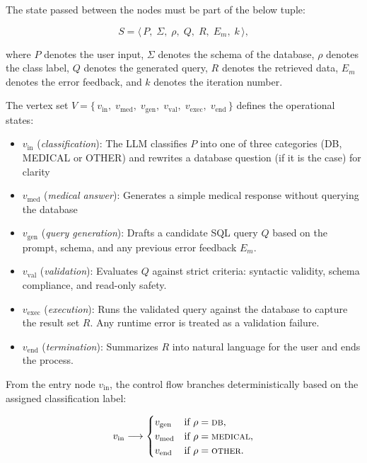 \vspace{1em}

The state passed between the nodes must be part of the below tuple:

\begin{equation}
    S = \langle\, P,\; \Sigma,\; \rho,\; Q,\; R,\; E_m,\; k \,\rangle,
    \label{eq:state}
\end{equation}

where $P$ denotes the user input, $\Sigma$ denotes the schema of the database, $\rho$ denotes the class label, $Q$ denotes the generated query, $R$ denotes the retrieved data, $E_m$ denotes the error feedback, and $k$ denotes the iteration number.

\clearpage

The vertex set $V = \{\, v_{\mathrm{in}},\; v_{\mathrm{med}},\; v_{\mathrm{gen}},\; v_{\mathrm{val}},\; v_{\mathrm{exec}},\; v_{\mathrm{end}} \,\}$ defines the operational states:

\begin{itemize}
    \item $v_{\mathrm{in}}$ (\emph{classification}): The LLM classifies $P$ into one of three categories  (DB, MEDICAL or OTHER) and rewrites a database question (if it is the case) for clarity
    \item $v_{\mathrm{med}}$ (\emph{medical answer}): Generates a simple medical response without querying the database
    \item $v_{\mathrm{gen}}$ (\emph{query generation}): Drafts a candidate SQL query $Q$ based on the prompt, schema, and any previous error feedback $E_m$.
    \item $v_{\mathrm{val}}$ (\emph{validation}): Evaluates $Q$ against strict criteria: syntactic validity, schema compliance, and read-only safety.
    \item $v_{\mathrm{exec}}$ (\emph{execution}): Runs the validated query against the database to capture the result set $R$. Any runtime error is treated as a validation failure.
    \item $v_{\mathrm{end}}$ (\emph{termination}): Summarizes $R$ into natural language for the user and ends the process.
\end{itemize}

From the entry node $v_{\mathrm{in}}$, the control flow branches deterministically based on the assigned classification label:

\begin{equation}
    v_{\mathrm{in}} \longrightarrow
    \begin{cases}
        v_{\mathrm{gen}} & \text{if } \rho = \textsc{db},\\
        v_{\mathrm{med}} & \text{if } \rho = \textsc{medical},\\
        v_{\mathrm{end}} & \text{if } \rho = \textsc{other}.
    \end{cases}
    \label{eq:branch}
\end{equation}

